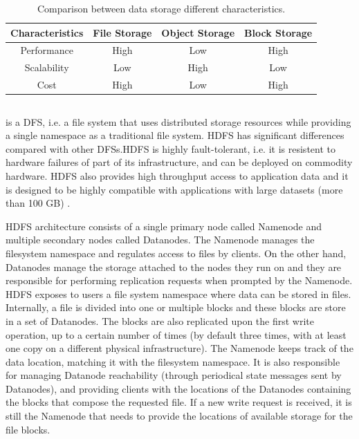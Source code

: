 \begin{table}[!ht]
    \begin{center}
      \caption{Comparison between data storage different characteristics.}
      \label{tab:storagecomparison}
      \begin{tabular}{cccc} %
        \toprule
        \textbf{Characteristics}\Tstrut\Bstrut & \textbf{File Storage} & \textbf{Object Storage} & \textbf{Block Storage}\\
        \midrule
        Performance & High & Low & High\Tstrut\\
        Scalability & Low & High & Low\\
        Cost & High & Low & High\Bstrut\\
        \bottomrule
      \end{tabular}
    \end{center}
\end{table}

\subsection{}

 is a \gls{DFS}, i.e. a file system that uses distributed storage resources while providing a single namespace as a traditional file system. \gls{HDFS} has significant differences compared with other \glspl{DFS}.\gls{HDFS} is highly fault-tolerant, i.e. it is resistent to hardware failures of part of its infrastructure, and can be deployed on commodity hardware. \gls{HDFS} also provides high throughput access to application data and it is designed to be highly compatible with applications with large datasets (more than 100 GB) \cite{borthakurHadoopDistributedFile2005}. 

\gls{HDFS} architecture consists of a single primary node called Namenode and multiple secondary nodes called Datanodes. The Namenode manages the filesystem namespace and regulates access to files by clients. On the other hand, Datanodes manage the storage attached to the nodes they run on and they are responsible for performing replication requests when prompted by the Namenode. \gls{HDFS} exposes to users a file system namespace where data can be stored in files. Internally, a file is divided into one or multiple blocks and these blocks are store in a set of Datanodes. The blocks are also replicated upon the first write operation, up to a certain number of times (by default three times, with at least one copy on a different physical infrastructure). The Namenode keeps track of the data location, matching it with the filesystem namespace. It is also responsible for managing Datanode reachability (through periodical state messages sent by Datanodes), and providing clients with the locations of the Datanodes containing the blocks that compose the requested file. If a new write request is received, it is still the Namenode that needs to provide the locations of available storage for the file blocks. 

